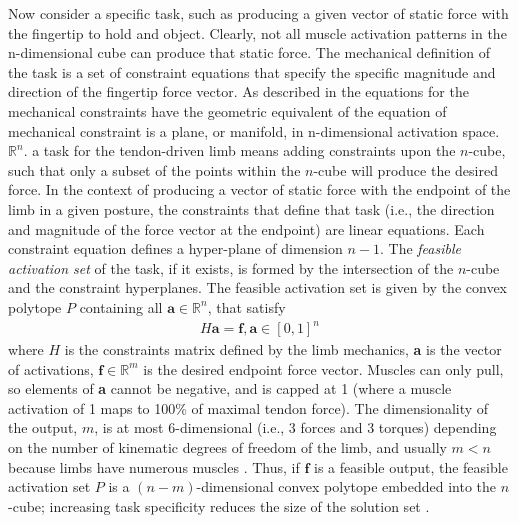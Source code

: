 \documentclass[10pt,letterpaper]{article}
\begin{document}
Now consider a specific task, such as producing a given vector of static force with the fingertip to hold and object. Clearly, not all muscle activation patterns in the n-dimensional cube can produce that static force. The mechanical definition of the task is a set of constraint equations that specify the specific magnitude and direction of the fingertip force vector. As described in  \cite{Chao1978Graphical, spoor1983balancing, Kuo1993Human, Valero-Cuevas1998Large} the equations for the mechanical constraints have the geometric equivalent of the equation of mechanical constraint is a plane, or manifold, in n-dimensional activation space.  $\mathbb{R}^n$.   a task for the tendon-driven limb means adding constraints upon the $n$-cube, such that only a subset of the points within the $n$-cube will produce the desired force.
In the context of producing a vector of static force with the endpoint of the limb in a given posture, the constraints that define that task (i.e., the direction and magnitude of the force vector at the endpoint) are linear equations.  Each constraint equation defines a hyper-plane of dimension $n-1$.
The \emph{feasible activation set} of the task, if it exists, is formed by the intersection of the $n$-cube and the constraint hyperplanes.
The feasible activation set is given by the convex polytope $P$ containing all $\textbf{a} \in \mathbb{R}^n$, that satisfy
\begin{align}
\label{eq:constraints}
		H\textbf{a} = \textbf{f}, \textbf{a} \in [0,1]^n
\end{align}
where $H$ is the constraints matrix defined by the limb mechanics, \textbf{a} is the vector of activations, $\textbf{f} \in \mathbb{R}^m$ is the desired endpoint force vector. Muscles can only pull, so elements of \textbf{a} cannot be negative, and is capped at 1 (where a muscle activation of 1 maps to 100\% of maximal tendon force).
The dimensionality of the output, $m$, is  at most 6-dimensional (i.e., 3 forces and 3 torques) depending on the number of kinematic degrees of freedom of the limb, and usually $m < n$  because  limbs have numerous  muscles \cite{valero-cuevas2015fundamentals}. Thus, if $\textbf{f}$ is a feasible  output, the feasible activation set $P$ is a $(n-m)$-dimensional convex polytope embedded into the $n$-cube; increasing task specificity reduces the size of the solution set \cite{Kuo1993Human,Valero-Cuevas1998Large,sohn2013cat_bounding_box}.
\end{document}
